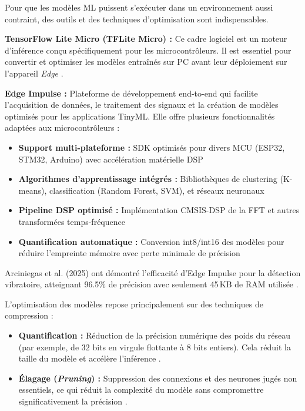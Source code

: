Pour que les modèles ML puissent s'exécuter dans un environnement aussi contraint, des outils et des techniques d'optimisation sont indispensables.

\textbf{TensorFlow Lite Micro (TFLite Micro) :} Ce cadre logiciel est un moteur d'inférence conçu spécifiquement pour les microcontrôleurs. Il est essentiel pour convertir et optimiser les modèles entraînés sur PC avant leur déploiement sur l'appareil \textit{Edge} \cite{tsoukas2024}.

\textbf{Edge Impulse :} Plateforme de développement end-to-end qui facilite l'acquisition de données, le traitement des signaux et la création de modèles optimisés pour les applications TinyML. Elle offre plusieurs fonctionnalités adaptées aux microcontrôleurs :

\begin{itemize}
\item \textbf{Support multi-plateforme :} SDK optimisés pour divers MCU (ESP32, STM32, Arduino) avec accélération matérielle DSP
\item \textbf{Algorithmes d'apprentissage intégrés :} Bibliothèques de clustering (K-means), classification (Random Forest, SVM), et réseaux neuronaux
\item \textbf{Pipeline DSP optimisé :} Implémentation CMSIS-DSP de la FFT et autres transformées temps-fréquence
\item \textbf{Quantification automatique :} Conversion int8/int16 des modèles pour réduire l'empreinte mémoire avec perte minimale de précision
\end{itemize}

Arciniegas et al. (2025) ont démontré l'efficacité d'Edge Impulse pour la détection vibratoire, atteignant 96.5\% de précision avec seulement 45\,KB de RAM utilisée \cite{arciniegas2025}.

L'optimisation des modèles repose principalement sur des techniques de compression :
\begin{itemize}
\item \textbf{Quantification :} Réduction de la précision numérique des poids du réseau (par exemple, de 32 bits en virgule flottante à 8 bits entiers). Cela réduit la taille du modèle et accélère l'inférence \cite{arciniegas2025,langer2025}.
\item \textbf{Élagage (\textit{Pruning}) :} Suppression des connexions et des neurones jugés non essentiels, ce qui réduit la complexité du modèle sans compromettre significativement la précision \cite{tsoukas2024}.
\end{itemize}

